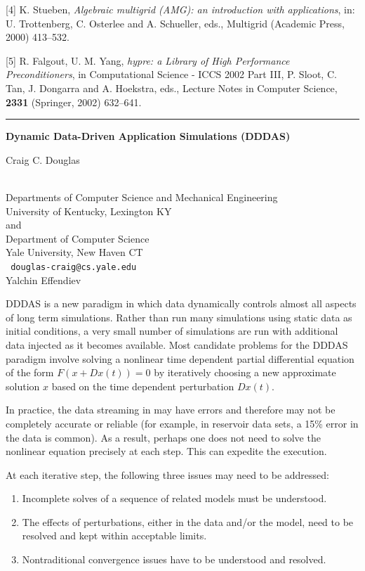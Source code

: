 \documentclass[twosided]{report}
\begin{document}
[4] K. Stueben, {\em Algebraic multigrid (AMG): an introduction with
applications}, in: U. Trottenberg, C. Osterlee and A. Schueller, eds.,
Multigrid (Academic Press, 2000) 413--532.

[5] R. Falgout, U. M. Yang, {\em hypre: a Library of High Performance
Preconditioners}, in Computational Science - ICCS 2002 Part III, P.
Sloot, C. Tan, J. Dongarra and A. Hoekstra, eds., Lecture Notes in
Computer Science, {\bf 2331} (Springer, 2002) 632--641.

\begin{center}

\rule{6in}{1pt}
\end{center}

\begin{center}
{\large			\label{douglas}
{\bf
Dynamic Data-Driven Application Simulations (DDDAS)
}

Craig C. Douglas} \\
Departments of Computer Science and Mechanical Engineering
\\
University of Kentucky, Lexington KY
\\
and
\\
Department of Computer Science \\ Yale University, New Haven CT
\\ {\tt
douglas-craig@cs.yale.edu
}
\\
Yalchin Effendiev
\end{center}

DDDAS is a new paradigm in which data dynamically controls almost all
aspects of long term simulations. Rather than run many simulations
using static data as initial conditions, a very small number of
simulations are run with additional data injected as it becomes
available. Most candidate problems for the DDDAS paradigm involve
solving a nonlinear time dependent partial differential equation of the
form
$F(x+Dx(t))=0$ by iteratively choosing a new approximate
solution $x$ based on the time dependent perturbation
$Dx(t)$.

In practice, the data streaming in may have errors and therefore may
not be completely accurate or reliable (for example, in reservoir data
sets, a 15\% error in the data is common). As a result, perhaps one does
not need to solve the nonlinear equation precisely at each step. This
can expedite the execution.

At each iterative step, the following three issues may need to be
addressed:
\begin{enumerate}
\item Incomplete solves of a sequence of related models must be
understood.
\item The effects of perturbations, either in the data and/or the
model, need to be resolved and kept within acceptable limits.
\item Nontraditional convergence issues have to be understood and
resolved.
\end{enumerate}
\end{document}
